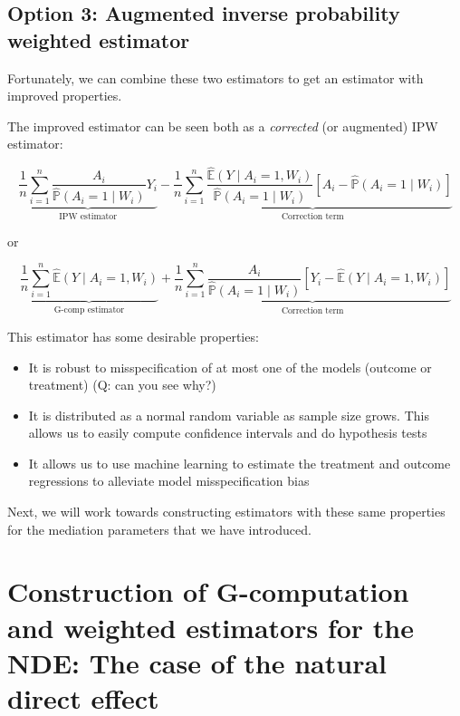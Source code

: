 \documentclass[
  12pt,
]{book}
\providecommand{\tightlist}{%
  \setlength{\itemsep}{0pt}\setlength{\parskip}{0pt}}
\theoremstyle{definition}
\theoremstyle{definition}
\theoremstyle{definition}
\renewcommand{\P}{\mathbb{P}}
\newcommand{\E}{\mathbb{E}}
\newcommand{\1}{\mathbbm{1}}
\begin{document}
\hypertarget{option-3-augmented-inverse-probability-weighted-estimator}{%
\section{Option 3: Augmented inverse probability weighted estimator}\label{option-3-augmented-inverse-probability-weighted-estimator}}

Fortunately, we can combine these two estimators to get an estimator with
improved properties.

The improved estimator can be seen both as a \emph{corrected} (or augmented) IPW
estimator:

\begin{equation*}
\underbrace{\frac{1}{n} \sum_{i=1}^n \frac{A_i}{\hat{\P}(A_i=1 \mid W_i)}
Y_i}_{\text{IPW estimator}} -
\underbrace{\frac{1}{n} \sum_{i=1}^n \frac{\hat{\E}(Y \mid A_i=1, W_i)}
  {\hat{\P}(A_i=1 \mid W_i)}[A_i - \hat{\P}(A_i=1 \mid
  W_i)]}_{\text{Correction term}}
\end{equation*}

or

\begin{equation*}
\underbrace{\frac{1}{n} \sum_{i=1}^n \hat{\E}(Y \mid A_i=1,
  W_i)}_{\text{G-comp estimator}} +
\underbrace{\frac{1}{n} \sum_{i=1}^n \frac{A_i}{\hat{\P}(A_i=1\mid W_i)}
  [Y_i - \hat{\E}(Y \mid A_i=1, W_i)]}_{\text{Correction term}}
\end{equation*}

This estimator has some desirable properties:

\begin{itemize}
\tightlist
\item
  It is robust to misspecification of at most one of the models (outcome or
  treatment) (Q: can you see why?)
\item
  It is distributed as a normal random variable as sample size grows. This
  allows us to easily compute confidence intervals and do hypothesis tests
\item
  It allows us to use machine learning to estimate the treatment and outcome
  regressions to alleviate model misspecification bias
\end{itemize}

Next, we will work towards constructing estimators with these same properties
for the mediation parameters that we have introduced.

\hypertarget{construction-of-g-computation-and-weighted-estimators-for-the-nde-the-case-of-the-natural-direct-effect}{%
\chapter{Construction of G-computation and weighted estimators for the NDE: The case of the natural direct effect}\label{construction-of-g-computation-and-weighted-estimators-for-the-nde-the-case-of-the-natural-direct-effect}}
\end{document}
